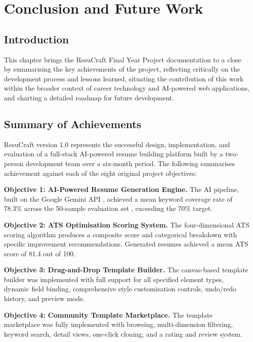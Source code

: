 \documentclass[12pt, a4paper, oneside]{report}
\begin{document}
\chapter{Conclusion and Future Work}

\section{Introduction}

This chapter brings the ResuCraft Final Year Project documentation to a close by summarising the key achievements of the project, reflecting critically on the development process and lessons learned, situating the contribution of this work within the broader context of career technology and AI-powered web applications, and charting a detailed roadmap for future development.

\section{Summary of Achievements}

ResuCraft version 1.0 represents the successful design, implementation, and evaluation of a full-stack AI-powered resume building platform built by a two-person development team over a six-month period. The following summarises achievement against each of the eight original project objectives:

\textbf{Objective 1: AI-Powered Resume Generation Engine.} The AI pipeline, built on the Google Gemini API \cite{gemini2023}, achieved a mean keyword coverage rate of 78.3\% across the 50-sample evaluation set \cite{qin2018}, exceeding the 70\% target.

\textbf{Objective 2: ATS Optimisation Scoring System.} The four-dimensional ATS scoring algorithm \cite{jobscan2021} produces a composite score and categorical breakdown with specific improvement recommendations. Generated resumes achieved a mean ATS score of 81.4 out of 100.

\textbf{Objective 3: Drag-and-Drop Template Builder.} The canvas-based template builder was implemented with full support for all specified element types, dynamic field binding, comprehensive style customisation controls, undo/redo history, and preview mode.

\textbf{Objective 4: Community Template Marketplace.} The template marketplace was fully implemented with browsing, multi-dimension filtering, keyword search, detail views, one-click cloning, and a rating and review system.
\end{document}
